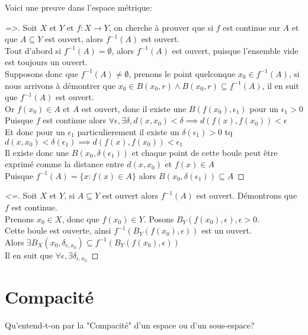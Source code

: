 \documentclass[12pt]{book}
\theoremstyle{definition}
\begin{document}
Voici une preuve dans l'espace métrique:
\begin{proof}[=>]
    Soit $X$ et $Y$ et $f: X \to Y$, on cherche à prouver que si $f$ est continue sur $A$ et que $A \subseteq Y$ est ouvert, alors $f^{-1}(A)$ est ouvert. \\
    Tout d'abord si $f^{-1}(A) = \emptyset$, alors $f^{-1}(A)$ est ouvert, puisque l'ensemble vide est toujours un ouvert. \\
    Supposons donc que $f^{-1}(A) \neq \emptyset$, prenons le point quelconque $x_0 \in f^{-1}(A)$, si nous arrivons à démontrer que 
    $x_0 \in B(x_0, r) \land B(x_0, r) \subseteq f^{-1}(A)$, il en suit que  $f^{-1}(A)$ est ouvert.\\
    Or $f(x_0) \in A$ et $A$ est ouvert, donc il existe une $B(f(x_0), \epsilon_1)$ pour un $\epsilon_1 > 0$ \\
    Puisque $f$ est continue alors $\forall \epsilon, \exists \delta, d(x, x_0) < \delta \implies d(f(x), f(x_0)) < \epsilon$ \\
    Et donc pour un $\epsilon_1$ particulierement il existe un $\delta(\epsilon_1) > 0$ tq $d(x, x_0) < \delta(\epsilon_1) \implies d(f(x), f(x_0)) < \epsilon_1$\\
    Il existe donc une $B(x_0, \delta(\epsilon_1))$ et chaque point de cette boule peut être exprimé comme la distance entre $d(x, x_0)$ et $f(x) \in A$\\
    Puisque  $f^{-1}(A) = \{x : f(x) \in A\}$ alors $B(x_0, \delta(\epsilon_1)) \subseteq A$
\end{proof}
\begin{proof}[<=]
    Soit $X$ et $Y$, si $A \subseteq Y$ est ouvert alors $f^{-1}(A)$ est ouvert. Démontrons que $f$ est continue.\\
    Prenons $x_0 \in X$, donc que $f(x_0) \in Y$. Posons $B_Y(f(x_0), \epsilon), \epsilon > 0$.\\
    Cette boule est ouverte, ainsi $f^{-1}(B_Y(f(x_0), \epsilon))$ est un ouvert.\\
    Alors $\exists B_X(x_0, \delta_{\epsilon, x_0}) \subseteq f^{-1}(B_Y(f(x_0), \epsilon))$\\
    Il en suit que $\forall \epsilon, \exists \delta_{\epsilon, x_0} $

\end{proof}
\chapter{Compacité}
Qu'entend-t-on par la "Compacité" d'un espace ou d'un sous-espace?
\end{document}
